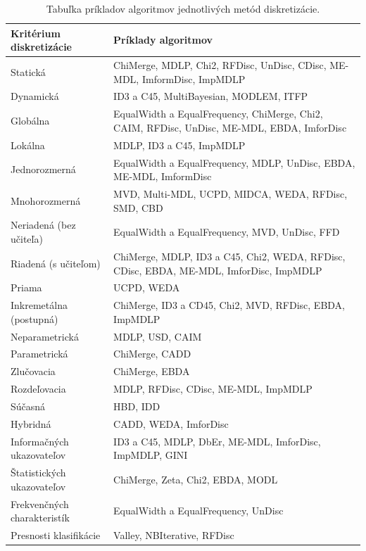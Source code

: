 \begin{table}[p]
	\centering
	\begin{tabular} { |p{5cm}|p{10cm}| }
		\hline 
		\textbf{Kritérium diskretizácie} & \textbf{Príklady algoritmov} \\ 
		\hline 
		Statická & ChiMerge, MDLP, Chi2, RFDisc, UnDisc, CDisc, ME-MDL, ImformDisc, ImpMDLP \\ 
		\hline 
		Dynamická & ID3 a C45, MultiBayesian, MODLEM, ITFP \\ 
		\hline 
		Globálna  & EqualWidth a EqualFrequency, ChiMerge, Chi2, CAIM, RFDisc, UnDisc, ME-MDL, EBDA, ImforDisc \\ 
		\hline 
		Lokálna & MDLP, ID3 a C45, ImpMDLP \\ 
		\hline 
		Jednorozmerná & EqualWidth a EqualFrequency, MDLP, UnDisc, EBDA, ME-MDL, ImformDisc \\ 
		\hline 
		Mnohorozmerná & MVD, Multi-MDL, UCPD, MIDCA, WEDA, RFDisc, SMD, CBD \\ 
		\hline 
		Neriadená (bez učiteľa)  & EqualWidth a EqualFrequency, MVD, UnDisc, FFD \\ 
		\hline 
		Riadená (s učiteľom) & ChiMerge, MDLP, ID3 a C45, Chi2, WEDA, RFDisc, CDisc, EBDA, ME-MDL, ImforDisc, ImpMDLP \\ 
		\hline 
		Priama & UCPD, WEDA \\ 
		\hline 
		Inkremetálna (postupná) & ChiMerge, ID3 a CD45, Chi2, MVD, RFDisc, EBDA, ImpMDLP \\ 
		\hline 
		Neparametrická & MDLP, USD, CAIM \\ 
		\hline 
		Parametrická & ChiMerge, CADD \\ 
		\hline 
		Zlučovacia & ChiMerge, EBDA \\ 
		\hline 
		Rozdeľovacia & MDLP, RFDisc, CDisc, ME-MDL, ImpMDLP \\ 
		\hline 	Súčasná & HBD, IDD \\ 
		\hline 
		Hybridná  & CADD, WEDA, ImforDisc \\ 
		\hline 
		Informačných ukazovateľov & ID3 a C45, MDLP, DbEr, ME-MDL, ImforDisc, ImpMDLP, GINI \\ 
		\hline 
		Štatistických ukazovateľov & ChiMerge, Zeta, Chi2, EBDA, MODL \\ 
		\hline 
		Frekvenčných charakteristík & EqualWidth a EqualFrequency, UnDisc \\ 
		\hline 
		Presnosti klasifikácie & Valley, NBIterative, RFDisc \\ 
		\hline 
	\end{tabular} 
	\caption{Tabuľka príkladov algoritmov jednotlivých metód diskretizácie.}
	\label{table:1}
\end{table}
 



